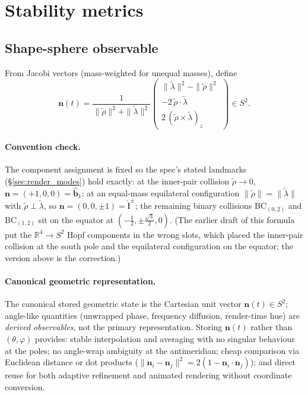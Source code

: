 \documentclass[11pt]{report}
\def\boldsymbol#1{#1}%
\begin{document}
\section{Stability metrics}
\label{sec:stability}

\subsection{Shape-sphere observable}
\label{sec:shape_sphere_obs}

From Jacobi vectors (mass-weighted for unequal masses), define
\[
\mathbf n(t)=\frac{1}{\|\tilde{\boldsymbol\rho}\|^2+\|\tilde{\boldsymbol\lambda}\|^2}\begin{pmatrix}\|\tilde{\boldsymbol\lambda}\|^2-\|\tilde{\boldsymbol\rho}\|^2\\-2\,\tilde{\boldsymbol\rho}\cdot\tilde{\boldsymbol\lambda}\\2\,(\tilde{\boldsymbol\rho}\times\tilde{\boldsymbol\lambda})_z\end{pmatrix}\in S^2.
\]

\paragraph{Convention check.} The component assignment is fixed so the spec's stated landmarks (\S\ref{sec:render_modes}) hold exactly: at the inner-pair collision $\tilde{\boldsymbol\rho}\to 0$, $\mathbf n=(+1,0,0)=\hat{\mathbf b}_1$; at an equal-mass equilateral configuration $\|\tilde\rho\|=\|\tilde\lambda\|$ with $\tilde\rho\perp\tilde\lambda$, so $\mathbf n=(0,0,\pm 1)=\hat{\mathbf l}^{\pm}$; the remaining binary collisions BC$_{(0,2)}$ and BC$_{(1,2)}$ sit on the equator at $(-\tfrac{1}{2},\pm\tfrac{\sqrt3}{2},0)$. (The earlier draft of this formula put the $\mathbb R^4\!\to\!S^2$ Hopf components in the wrong slots, which placed the inner-pair collision at the south pole and the equilateral configuration on the equator; the version above is the correction.)

\paragraph{Canonical geometric representation.}
The canonical stored geometric state is the Cartesian unit vector $\mathbf n(t)\in S^2$; angle-like quantities (unwrapped phase, frequency diffusion, render-time hue) are \emph{derived observables}, not the primary representation. Storing $\mathbf n(t)$ rather than $(\theta,\varphi)$ provides: stable interpolation and averaging with no singular behaviour at the poles; no angle-wrap ambiguity at the antimeridian; cheap comparison via Euclidean distance or dot products ($\|\mathbf n_i-\mathbf n_j\|^2=2(1-\mathbf n_i\cdot\mathbf n_j)$); and direct reuse for both adaptive refinement and animated rendering without coordinate conversion.
\end{document}
